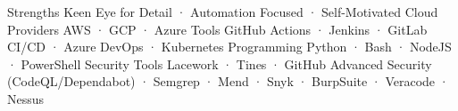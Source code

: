 


\begin{cvaboutme}
    \cvabout
        {Strengths}
        {Keen Eye for Detail · Automation Focused · Self-Motivated}
    \cvabout
        {Cloud Providers}
        {AWS · GCP · Azure}
    \cvabout
        {Tools}
        {GitHub Actions · Jenkins · GitLab CI/CD · Azure DevOps · Kubernetes}
    \cvabout
        {Programming}
        {Python · Bash · NodeJS · PowerShell}
    \cvabout
        {Security Tools}
        {Lacework · Tines · GitHub Advanced Security (CodeQL/Dependabot) · Semgrep · Mend · Snyk · BurpSuite · Veracode · Nessus}
\cvsubsection{}
\end{cvaboutme}